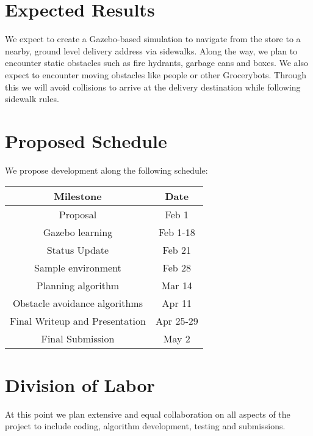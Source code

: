 \documentclass{article}
\begin{document}
\begin{multicols}{2}
\section*{Expected Results}
We expect to create a Gazebo-based simulation to navigate from the store to a nearby, ground level delivery address via sidewalks.  Along the way, we plan to encounter static obstacles such as fire hydrants, garbage cans and boxes.  We also expect to encounter moving obstacles like people or other Grocerybots.  Through this we will avoid collisions to arrive at the delivery destination while following sidewalk rules.

\section*{Proposed Schedule}
We propose development along the following schedule:

\begin{center}
\begin{tabular}{|cc|}
\hline
Milestone & Date  \\
\hline
Proposal  &  Feb 1 \\
Gazebo learning  &  Feb 1-18 \\
Status Update  &  Feb 21 \\
Sample environment & Feb 28\\
Planning algorithm & Mar 14\\
Obstacle avoidance algorithms & Apr 11\\
Final Writeup and Presentation & Apr 25-29\\
Final Submission  &  May 2 \\
\hline
\end{tabular}
\end{center}

\section*{Division of Labor}
At this point we plan extensive and equal collaboration on all aspects of the project to include coding, algorithm development, testing and submissions.

\label{References}


\end{multicols}
\end{document}
